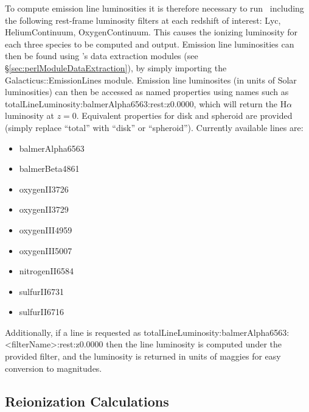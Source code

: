 To compute emission line luminosities it is therefore necessary to run \glc\ including the following rest-frame luminosity filters at each redshift of interest: {\normalfont \ttfamily Lyc}, {\normalfont \ttfamily HeliumContinuum}, {\normalfont \ttfamily OxygenContinuum}. This causes the ionizing luminosity for each three species to be computed and output. Emission line luminosities can then be found using \glc's data extraction modules (see \S\ref{sec:perlModuleDataExtraction}), by simply importing the {\normalfont \ttfamily Galacticus::EmissionLines} module. Emission line luminosites (in units of Solar luminosities) can then be accessed as named properties using names such as {\normalfont \ttfamily totalLineLuminosity:balmerAlpha6563:rest:z0.0000}, which will return the H$\alpha$ luminosity at $z=0$. Equivalent properties for disk and spheroid are provided (simply replace ``{\normalfont \ttfamily total}'' with ``{\normalfont \ttfamily disk}'' or ``{\normalfont \ttfamily spheroid}''). Currently available lines are:
\begin{itemize}
\item {\normalfont \ttfamily balmerAlpha6563}
\item {\normalfont \ttfamily balmerBeta4861}
\item {\normalfont \ttfamily oxygenII3726}
\item {\normalfont \ttfamily oxygenII3729}
\item {\normalfont \ttfamily oxygenIII4959}
\item {\normalfont \ttfamily oxygenIII5007}
\item {\normalfont \ttfamily nitrogenII6584}
\item {\normalfont \ttfamily sulfurII6731}
\item {\normalfont \ttfamily sulfurII6716}
\end{itemize}

Additionally, if a line is requested as {\normalfont \ttfamily totalLineLuminosity:balmerAlpha6563:<filterName>:rest:z0.0000} then the line luminosity is computed under the provided filter, and the luminosity is returned in units of \glspl{maggie} for easy conversion to magnitudes.

\subsection{Reionization Calculations}\label{sed:ReionziationTutorial}

